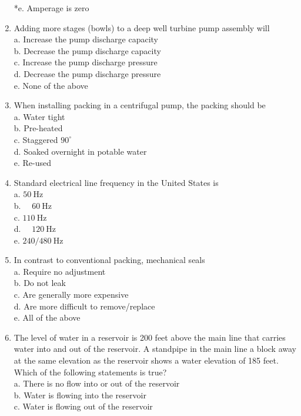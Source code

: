 \begin{enumerate}[1.]
*e. Amperage is zero\\
\item Adding more stages (bowls) to a deep well turbine pump assembly will\\
a. Increase the pump discharge capacity\\
b. Decrease the pump discharge capacity\\
c. Increase the pump discharge pressure\\
d. Decrease the pump discharge pressure\\
e. None of the above\\
\item When installing packing in a centrifugal pump, the packing should be\\
a. Water tight\\
b. Pre-heated\\
c. Staggered $90^{\circ}$\\
d. Soaked overnight in potable water\\
e. Re-used\\
\item Standard electrical line frequency in the United States is\\
a. $50 \mathrm{~Hz}$\\
b. $\quad 60 \mathrm{~Hz}$\\
c. $110 \mathrm{~Hz}$\\
d. $\quad 120 \mathrm{~Hz}$\\
e. $240 / 480 \mathrm{~Hz}$\\
\item In contrast to conventional packing, mechanical seals\\
a. Require no adjustment\\
b. Do not leak\\
c. Are generally more expensive\\
d. Are more difficult to remove/replace\\
e. All of the above\\
\item The level of water in a reservoir is 200 feet above the main line that carries water into and out of the reservoir. A standpipe in the main line a block away at the same elevation as the reservoir shows a water elevation of 185 feet. Which of the following statements is true?\\
a. There is no flow into or out of the reservoir\\
b. Water is flowing into the reservoir\\
c. Water is flowing out of the reservoir\\

\end{enumerate}
